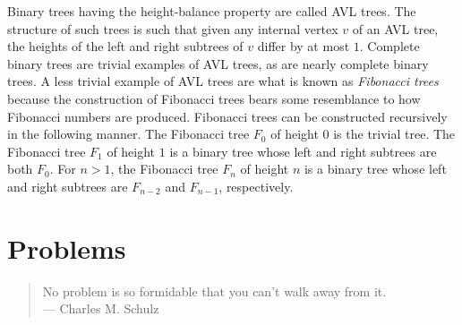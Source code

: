 Binary trees having the height-balance property are called
AVL trees. The structure of such trees is such that
given any internal vertex $v$ of an AVL tree, the heights of the left
and right subtrees of $v$ differ by at most $1$.
Complete binary trees are trivial examples
of AVL trees, as are nearly
complete binary trees. A less trivial example of AVL trees are what is
known as \emph{Fibonacci trees} because the
construction of Fibonacci trees bears some resemblance to how
Fibonacci numbers are produced. Fibonacci
trees can be constructed recursively in the following manner. The
Fibonacci tree $F_0$ of height $0$ is the trivial tree. The Fibonacci
tree $F_1$ of height $1$ is a binary tree whose left and right
subtrees are both $F_0$. For $n > 1$, the Fibonacci tree $F_n$ of
height $n$ is a binary tree whose left and right subtrees are
$F_{n-2}$ and $F_{n-1}$, respectively.




\section{Problems}

\begin{quote}
\footnotesize
No problem is so formidable that you can't walk away from it. \\
\noindent
--- Charles M. Schulz
\end{quote}

